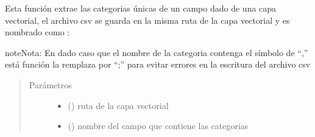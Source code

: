 \documentclass[letterpaper,10pt,spanish]{sphinxmanual}
\begin{document}
\begin{fulllineitems}
\label{\detokenize{apcsig:apcsig.categorias_campo_csv}}
Esta función extrae las categorias únicas de un campo dado de una capa vectorial, el 
archivo csv se guarda en la misma ruta de la capa vectorial y es nombrado como : 

\begin{sphinxadmonition}{note}{Nota:}
En dado caso que el nombre de la categoria contenga el símbolo de “,” está función la remplaza por “;” para evitar errores en la escritura del archivo csv
\end{sphinxadmonition}
\begin{quote}\begin{description}
\item[{Parámetros}] \leavevmode\begin{itemize}
\item {} 
 () \textendash{} ruta de la capa vectorial

\item {} 
 () \textendash{} nombre del campo que contiene las categorias

\end{itemize}

\end{description}\end{quote}

\end{fulllineitems}

\end{document}
